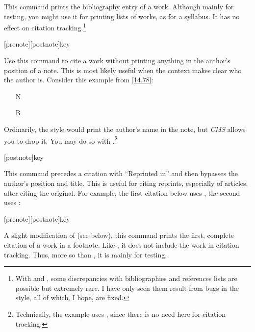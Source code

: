 \documentclass[11pt,letterpaper,oneside]{article}
\begin{document}
\begin{ltxsyntax}


This command prints the bibliography entry of a work. Although mainly
for testing, you might use it for printing lists of works, as for a
syllabus. It has no effect on citation tracking.\footnote{With
 and , some discrepancies with
bibliographies and references lists are possible but extremely rare. I
have only seen them result from bugs in the style, all of which, I
hope, are fixed.}

[prenote][postnote]{key}

Use this command to cite a work without printing anything in the
author's position of a note. This is most likely useful when the
context makes clear who the author is. Consider this example from
\ref{14.78}:

\begin{itemize}
\item[N] 

\item[B] 
\end{itemize}

\noindent Ordinarily, the style would print the author's name in the
note, but \textit{CMS} allows you to drop it. You may do so with
.\footnote{Technically, the example uses ,
since there is no need here for citation tracking.}

[postnote]{key}

This command precedes a citation with ``Reprinted in'' and then
bypasses the author's position and title. This is useful for citing
reprints, especially of articles, after citing the original. For
example, the first citation below uses , the second uses
:

\begin{itemize}
\item[] \cite{frankfurt1969} 
\end{itemize}

[prenote][postnote]{key}

A slight modification of  (see below), this command
prints the first, complete citation of a work in a footnote. Like
, it does not include the work in citation tracking.
Thus, more so than , it is mainly for testing.


\end{ltxsyntax}
\end{document}
